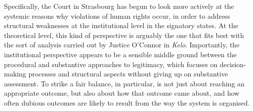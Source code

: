 

Specifically, the Court in Strasbourg has begun to look more actively at the systemic reasons why violations of human rights occur, in order to address structural weaknesses at the institutional level in the signatory states. At the theoretical level, this kind of perspective is arguably the one that fits best with the sort of analysis carried out by Justice O'Connor in {\it Kelo}. Importantly, the institutional perspective appears to be a sensible middle ground between the procedural and substantive approaches to legitimacy, which focuses on decision-making processes and structural aspects without giving up on substantive assessment. To strike a fair balance, in particular, is not just about reaching an appropriate outcome, but also about how that outcome came about, and how often dubious outcomes are likely to result from the way the system is organised.





